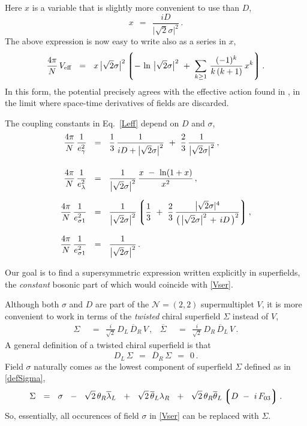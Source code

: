 \documentclass[epsfig,12pt]{article}
\def\beq{\begin{equation}}
\def\eeq{\end{equation}}
\newcommand{\ntwot}{${\mathcal N}= \left(2,2\right) $ }
\newcommand{\ov}{\overline}
\newcommand{\lgr}{\left\lgroup}
\newcommand{\rgr}{\right\rgroup}
\begin{document}
	Here $ x $ is a variable that is slightly more convenient to use than $ D $,
\beq
	x    ~~=~~    \frac{iD}{\big|\sqrt{2}\sigma\big|^2}\,.
\eeq
	The above expression is now easy to write also as a series in $ x $,
\beq
\label{Vser}
	 \frac{4\pi}{N}\, V_\text{eff}    ~~=~~
		x\, \big|\sqrt{2}\sigma\big|^2 \lgr -\, \ln\, \big|\sqrt{2}\sigma\big|^2 ~+~
		\sum_{k \geq 1}\, \frac{(-1)^k} 
                                      { k\,(k + 1) }\, x^k \rgr.
\eeq
	In this form, the potential precisely agrees with the effective action found in \cite{1p},
	in the limit where space-time derivatives of fields are discarded.

	The coupling constants in Eq.~\eqref{Leff} depend on $ D $ and $ \sigma $,
\begin{align}
%
\notag
	\frac{4\pi}{N}\, \frac{1}{e_\gamma^2}  & ~~=~~
                                        \frac{1}{3}\,\frac{1}{iD + \big|\sqrt{2}\sigma\big|^2}  ~+~
                                        \frac{2}{3}\,\frac{1}{\big|\sqrt{2}\sigma\big|^2}\,,
        \\[4mm]
%
\notag
	\frac{4\pi}{N}\, \frac{1}{e_\lambda^2}  & ~~=~~
                                        \frac{1}{\big|\sqrt{2}\sigma\big|^2}\, \frac{ x ~-~ \ln(1 + x) }{x^2}\,,
	\\[2mm]
%
\label{couplings}
	\frac{4\pi}{N}\, \frac{1}{e_{\sigma 1}^2}  & ~~=~~
		\frac{1}{\big|\sqrt{2}\sigma\big|^2}
			\lgr \frac 1 3 ~+~ \frac 2 3\, \frac{\big|\sqrt{2}\sigma|^4}
							{\big(\, \big|\sqrt{2}\sigma\big|^2 \,+\, iD \,\big)^2} \rgr,
	\\[3mm]
%
\notag
	\frac{4\pi}{N}\, \frac{1}{e_{\sigma 1}^2}  & ~~=~~
		\frac{1}{\big|\sqrt{2}\sigma\big|^2}\,.
\end{align}

	Our goal is to find a supersymmetric expression written explicitly in superfields,
	the {\it constant} bosonic part of which would coincide with \eqref{Vser}.

	Although both $ \sigma $ and $ D $ are part of the \ntwot supermultiplet $ V $,
	it is more convenient to work in terms of the {\it twisted} chiral superfield $ \Sigma $
	instead of $ V $,
\begin{align}
\label{defSigma}
	\Sigma    & ~~=~~    \frac{i}{\sqrt 2}\, D_L\, \ov D{}_R\, V\,,
	&
	\ov \Sigma    & ~~=~~    \frac{i}{\sqrt 2}\, D_R\, \ov D{}_L\, V\,.
\end{align}
	A general definition of a twisted chiral superfield is that
\beq
	D_L\, \Sigma    ~~=~~    \ov D{}_R\, \Sigma    ~~=~~    0\,.
\eeq
	Field $ \sigma $ naturally comes as the lowest component of superfield $ \Sigma $
	defined as in \eqref{defSigma},
\beq
	\Sigma     ~~=~~    \sigma  ~~-~~  \sqrt{2}\, \theta_R \ov\lambda{}_L
				    ~~+~~  \sqrt{2}\, \ov\theta{}_L \lambda_R
				    ~~+~~  \sqrt{2}\, \theta_R \ov\theta{}_L \lgr D ~-~ i\, F_{03} \rgr.
\eeq
	So, essentially, all occurences of field $ \sigma $ in \eqref{Vser} can be replaced with $ \Sigma $.
\end{document}
